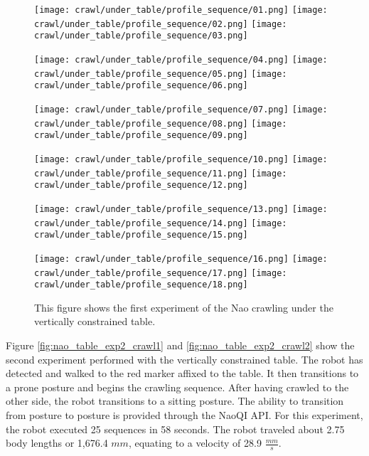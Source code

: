 \begin{figure}
  \centerline{
    \texttt{[image: crawl/under\_table/profile\_sequence/01.png]}
    \texttt{[image: crawl/under\_table/profile\_sequence/02.png]}
    \texttt{[image: crawl/under\_table/profile\_sequence/03.png]}
  }
  \vspace*{0.05in}
  \centerline{
    \texttt{[image: crawl/under\_table/profile\_sequence/04.png]}
    \texttt{[image: crawl/under\_table/profile\_sequence/05.png]}
    \texttt{[image: crawl/under\_table/profile\_sequence/06.png]}
  }
    \vspace*{0.05in}
  \centerline{
    \texttt{[image: crawl/under\_table/profile\_sequence/07.png]}
    \texttt{[image: crawl/under\_table/profile\_sequence/08.png]}
    \texttt{[image: crawl/under\_table/profile\_sequence/09.png]}
  }
    \vspace*{0.05in}
  \centerline{
    \texttt{[image: crawl/under\_table/profile\_sequence/10.png]}
    \texttt{[image: crawl/under\_table/profile\_sequence/11.png]}
    \texttt{[image: crawl/under\_table/profile\_sequence/12.png]}
  }
    \vspace*{0.05in}
  \centerline{
    \texttt{[image: crawl/under\_table/profile\_sequence/13.png]}
    \texttt{[image: crawl/under\_table/profile\_sequence/14.png]}
    \texttt{[image: crawl/under\_table/profile\_sequence/15.png]}
  }
    \vspace*{0.05in}
  \centerline{
    \texttt{[image: crawl/under\_table/profile\_sequence/16.png]}
    \texttt{[image: crawl/under\_table/profile\_sequence/17.png]}
    \texttt{[image: crawl/under\_table/profile\_sequence/18.png]}
  }
  \caption{This figure shows the first experiment of the Nao crawling under the vertically constrained table.}
  \label{fig:nao_table_exp1_crawl1}
\end{figure}

Figure \ref{fig:nao_table_exp2_crawl1} and \ref{fig:nao_table_exp2_crawl2} show the second
experiment performed with the vertically constrained table. The robot has detected and walked to
the red marker affixed to the table. It then transitions to a prone posture and begins the crawling
sequence. After having crawled to the other side, the robot transitions to a sitting posture.
The ability to transition from posture to posture is provided through the NaoQI API.
For this experiment, the robot executed 25 sequences in 58 seconds. The robot traveled
about 2.75 body lengths or 1,676.4 $mm$, equating to a velocity of 28.9 $\frac{mm}{s}$.


